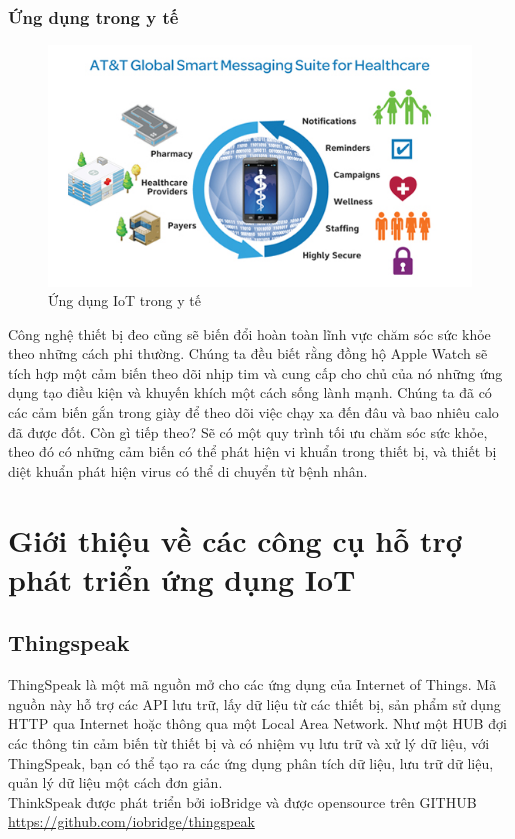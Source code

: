 \subsubsection*{Ứng dụng trong y tế}
\begin{figure}[H] 
\centering    
\includegraphics[width=1\textwidth]{pic11}
\caption[Ứng dụng IoT trong y tế ]{Ứng dụng IoT trong y tế}
\label{fig:pic11}
\end{figure}
Công nghệ thiết bị đeo cũng sẽ biến đổi hoàn toàn lĩnh vực chăm sóc sức khỏe theo những cách phi thường. Chúng ta đều biết rằng đồng hộ Apple Watch sẽ tích hợp một cảm biến theo dõi nhịp tim và cung cấp cho chủ của nó những ứng dụng tạo điều kiện và khuyến khích một cách sống lành mạnh. Chúng ta đã có các cảm biến gắn trong giày để theo dõi việc chạy xa đến đâu và bao nhiêu calo đã được đốt. Còn gì tiếp theo? Sẽ có một quy trình tối ưu chăm sóc sức khỏe, theo đó có những cảm biến có thể phát hiện vi khuẩn trong thiết bị, và thiết bị diệt khuẩn phát hiện virus có thể di chuyển từ bệnh nhân.


\section{Giới thiệu về các công cụ hỗ trợ phát triển ứng dụng IoT}
\subsection*{Thingspeak}
ThingSpeak là một mã nguồn mở cho các ứng dụng của Internet of Things. Mã nguồn này hỗ trợ các API lưu trữ, lấy dữ liệu từ các thiết bị, sản phẩm sử dụng HTTP qua Internet hoặc thông qua một Local Area Network. Như một HUB đợi các thông tin cảm biến từ thiết bị và có nhiệm vụ lưu trữ và xử lý dữ liệu, với ThingSpeak, bạn có thể tạo ra các ứng dụng phân tích dữ liệu, lưu trữ dữ liệu, quản lý dữ liệu một cách đơn giản.\\
ThinkSpeak được phát triển bởi ioBridge và được opensource trên GITHUB  \url{https://github.com/iobridge/thingspeak}

